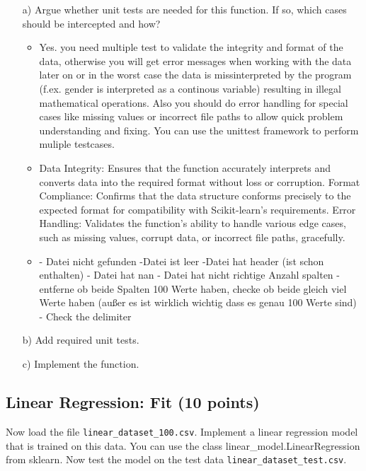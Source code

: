 \begin{enumerate}

\item[a)] Argue whether unit tests are needed for this function. If so, which cases should be intercepted and how?
	\begin{itemize}
		\item
Yes. you need multiple test to validate the integrity and format of the data, otherwise you will get error messages when working with the data later on or in the worst case the data is missinterpreted by the program (f.ex. gender is interpreted as a continous variable) resulting in illegal mathematical operations. Also you should do error handling for special cases like missing values or incorrect file paths to allow quick problem understanding and fixing.  You can use the unittest framework to perform muliple testcases.
		\item
Data Integrity: Ensures that the function accurately interprets and converts data into the required format without loss or corruption.
Format Compliance: Confirms that the data structure conforms precisely to the expected format for compatibility with Scikit-learn's requirements.
Error Handling: Validates the function's ability to handle various edge cases, such as missing values, corrupt data, or incorrect file paths, gracefully.
		\item
		- Datei nicht gefunden
		-Datei ist leer
		-Datei hat header (ist schon enthalten)
		- Datei hat nan
		- Datei hat nicht richtige Anzahl spalten
		- entferne ob beide Spalten 100 Werte haben, checke ob beide gleich viel Werte haben (außer es ist wirklich wichtig dass es genau 100 Werte sind)
		- Check the delimiter
	\end{itemize}

\item[b)] Add required unit tests.

\item[c)] Implement the function.

\end{enumerate}

\subsection{Linear Regression: Fit (10 points)}

Now load the file \texttt{linear\_dataset\_100.csv}. Implement a linear regression model that is trained on this data. You can use the class linear\_model.LinearRegression from sklearn. Now test the model on the test data \texttt{linear\_dataset\_test.csv}.

